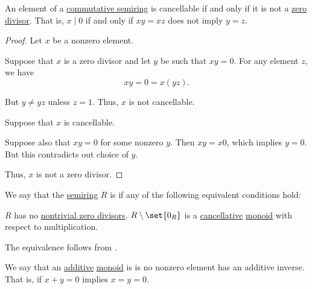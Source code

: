 \begin{proposition}\label{thm:semiring_cancellative_iff_no_zero_divisors}
  An element of a \hyperref[def:semiring/commutative]{commutative semiring} is cancellable if and only if it is not a \hyperref[def:divisibility]{zero divisor}. That is, \( x \mid 0 \) if and only if \( xy = xz \) does not imply \( y = z \).
\end{proposition}
\begin{proof}
  Let \( x \) be a nonzero element.

  \SufficiencySubProof Suppose that \( x \) is a zero divisor and let \( y \) be such that \( xy = 0 \). For any element \( z \), we have
  \begin{equation*}
    xy = 0 = x(yz).
  \end{equation*}

  But \( y \neq yz \) unless \( z = 1 \). Thus, \( x \) is not cancellable.

  \NecessitySubProof Suppose that \( x \) is cancellable.

  Suppose also that \( xy = 0 \) for some nonzero \( y \). Then \( xy = x0 \), which implies \( y = 0 \). But this contradicts out choice of \( y \).

  Thus, \( x \) is not a zero divisor.
\end{proof}

\begin{definition}\label{def:entire_semiring}
  We say that the \hyperref[def:semiring]{semiring} \( R \) is  if any of the following equivalent conditions hold:
  \begin{thmenum}
     \( R \) has no \hyperref[def:divisibility/zero]{nontrivial zero divisors}.
     \( R \setminus \set{ 0_R } \) is a \hyperref[def:magma/cancellative]{cancellative} \hyperref[def:monoid]{monoid} with respect to multiplication.
  \end{thmenum}
\end{definition}
\begin{defproof}
  The equivalence follows from .
\end{defproof}

\begin{definition}\label{def:zerosumfree}
  We say that an \hyperref[rem:additive_magma]{additive} \hyperref[def:monoid]{monoid} is  is no nonzero element has an additive inverse. That is, if \( x + y = 0 \) implies \( x = y = 0 \).
\end{definition}

